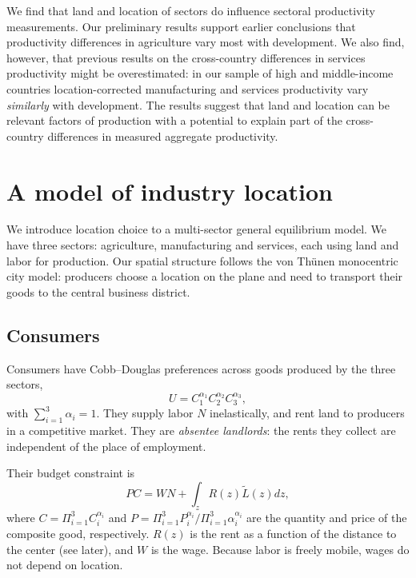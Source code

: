 \documentclass[12pt]{article}
\begin{document}
We find that land and location of sectors do influence sectoral productivity measurements. Our preliminary results support earlier conclusions that productivity differences in agriculture vary most with development. We also find, however, that previous results on the cross-country differences in services productivity might be overestimated: in our sample of high and middle-income countries location-corrected manufacturing and services productivity vary \emph{similarly} with development. The results suggest that land and location can be relevant factors of production with a potential to explain part of the cross-country differences in measured aggregate productivity.

\section{A model of industry location}
We introduce location choice to a multi-sector general equilibrium model. We have three sectors: agriculture, manufacturing and services, each using land and labor for production. Our spatial structure follows the von Thünen monocentric city model: producers choose a location on the plane and need to transport their goods to the central business district. %

\subsection{Consumers}
Consumers have Cobb--Douglas preferences across goods produced by the three sectors,
\begin{equation}
\label{eq:Utility}
U = C_1^{\alpha_1}C_2^{\alpha_2}C_3^{\alpha_3},
\end{equation}
with $\sum_{i=1}^3\alpha_i=1$. They supply labor $N$ inelastically, and rent land to producers in a competitive market. They are \emph{absentee landlords}: the rents they collect are independent of the place of employment.

Their budget constraint is
\begin{equation}
\label{eq:BudCons}
PC=WN+\int_z R(z)\tilde{L}(z)dz,
\end{equation}
where $C=\Pi_{i=1}^3C_i^{\alpha_i}$ and $P=\Pi_{i=1}^3P_i^{\alpha_i}/\Pi_{i=1}^3\alpha_i^{\alpha_i}$ are the quantity and price of the composite good, respectively. $R(z)$ is the rent as a function of the distance to the center (see later), and $W$ is the wage. Because labor is freely mobile, wages do not depend on location.
\end{document}
